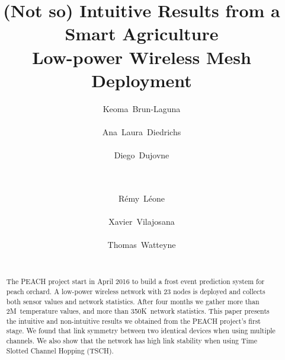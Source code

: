 \documentclass{sig-alternate}
\begin{document}
\title{(Not so) Intuitive Results from a Smart Agriculture\\Low-power Wireless Mesh Deployment}

\author{
    \alignauthor Keoma~Brun-Laguna\\
        \\
    \alignauthor Ana~Laura~Diedrichs\\
        \\
    \alignauthor Diego~Dujovne\\
        \\
        \\
    \and
    \alignauthor R\'emy~L\'eone\\
        \\
    \alignauthor Xavier~Vilajosana\\
        \\
    \alignauthor Thomas~Watteyne\\
        \\
}

\maketitle

\begin{abstract}
The PEACH project start in April 2016 to build a frost event prediction system for peach orchard.
A low-power wireless network with 23 nodes is deployed and collects both sensor values and network statistics.
After four months we gather more than 2M~temperature values, and more than 350K~network statistics.
This paper presents the intuitive and non-intuitive results we obtained from the PEACH project's first stage.
We found that link symmetry between two identical devices when using multiple channels.
We also show that the network has high link stability when using Time Slotted Channel Hopping (TSCH).
\end{abstract}
\end{document}
